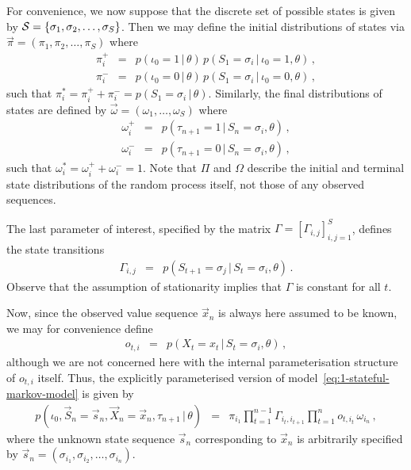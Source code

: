 \documentclass[a4paper]{article}
\begin{document}
For convenience, we now suppose that the discrete set of possible states is given by
${\cal S}=\{\sigma_1,\sigma_2,\ldots,\sigma_S\}$.
Then we may define the initial distributions of states via $\vec{\pi}=(\pi_{1},\pi_{2},\ldots,\pi_{S})$ where
\begin{eqnarray}
  \pi_{i}^+ & = & p(\iota_0\!=\!1\,|\,\theta)\,p(S_1\!=\!\sigma_i\,|\,\iota_0\!=\!1,\theta)\,,
\\
  \pi_{i}^- & = & p(\iota_0\!=\!0\,|\,\theta)\,p(S_1\!=\!\sigma_i\,|\,\iota_0\!=\!0,\theta)\,,
\end{eqnarray}
such that $\pi_{i}^*=\pi_i^{+}+\pi_i^{-}=p(S_1\!=\!\sigma_i\,|\,\theta)$.
Similarly, the final distributions of states are defined by $\vec{\omega}=(\omega_1,\ldots,\omega_S)$ where
\begin{eqnarray}
  \omega_{i}^+ & = & p(\tau_{n+1}=1\,|\,S_n\!=\!\sigma_i,\theta)\,,
\\
  \omega_{i}^- & = & p(\tau_{n+1}=0\,|\,S_n\!=\!\sigma_i,\theta)\,,
\end{eqnarray}
such that $\omega_{i}^*=\omega_i^{+}+\omega_i^{-}=1$.
Note that $\Pi$ and $\Omega$ describe the initial and terminal state distributions of the random process itself, not those of any observed sequences.

The last parameter of interest, specified by the matrix $\Gamma=[\Gamma_{i,j}]_{i,j=1}^{S}$, defines the state transitions
\begin{eqnarray}
  \Gamma_{i,j} & = & p(S_{t+1}\!=\!\sigma_j\,|\,S_t\!=\!\sigma_i,\theta)\,.
\end{eqnarray}
Observe that the assumption of stationarity implies that $\Gamma$ is constant for all $t$.

Now, since the observed value sequence $\vec{x}_n$ is always here assumed to be known, we may for convenience define
\begin{eqnarray}
  o_{t,i} & = & p(X_t\!=\!x_t\,|\,S_t\!=\!\sigma_i,\theta)\,,
\end{eqnarray}
although we are not concerned here with the internal parameterisation structure of $o_{t,i}$ itself.
Thus, the explicitly parameterised version of model~\eqref{eq:1-stateful-markov-model} is given by
\begin{eqnarray}
  p(\iota_0,\vec{S}_n\!=\!\vec{s}_n,\vec{X}_n\!=\!\vec{x}_n,\tau_{n+1}\,|\,\theta) 
&\!\!=\!\!& 
  \pi_{i_1}\prod_{t=1}^{n-1}\Gamma_{i_t,i_{t+1}}\prod_{t=1}^{n}o_{t,i_t}\,\omega_{i_n}
\,,
\label{eq:param-markov-model}
\end{eqnarray}
where the unknown state sequence $\vec{s}_n$ corresponding to $\vec{x}_n$ is arbitrarily
specified by $\vec{s}_n=(\sigma_{i_1},\sigma_{i_2},\ldots,\sigma_{i_n})$.
\end{document}
